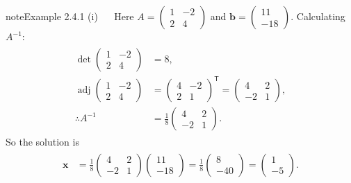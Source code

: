 \documentclass[letterpaper,10pt,english]{jupyterBook}
\begin{document}
\begin{sphinxadmonition}{note}{Example 2.4.1}
\sphinxAtStartPar
(i)   Here \(A = \begin{pmatrix} 1 & -2 \\ 2 & 4 \end{pmatrix}\) and \(\mathbf{b} = \begin{pmatrix} 11 \\ -18 \end{pmatrix}\). Calculating \(A^{-1}\):
\begin{equation*}
\begin{split} \begin{align*}
    \det\begin{pmatrix} 1 & -2 \\ 2 & 4 \end{pmatrix} &= 8, \\
    \operatorname{adj}\begin{pmatrix} 1 & -2 \\ 2 & 4 \end{pmatrix} &=
    \begin{pmatrix} 4 & -2 \\ 2 & 1 \end{pmatrix}^\mathsf{T} =
    \begin{pmatrix} 4 & 2 \\ -2 & 1 \end{pmatrix},\\
    \therefore A^{-1} &= \frac{1}{8} \begin{pmatrix} 4 & 2 \\ -2 & 1 \end{pmatrix}.
\end{align*} \end{split}
\end{equation*}
\sphinxAtStartPar
So the solution is
\begin{equation*}
\begin{split} \begin{align*}
    \mathbf{x} &= \frac{1}{8} \begin{pmatrix} 4 & 2 \\ -2 & 1 \end{pmatrix}
    \begin{pmatrix} 11 \\ -18 \end{pmatrix} =
    \frac{1}{8} \begin{pmatrix} 8 \\ -40 \end{pmatrix} =
    \begin{pmatrix} 1 \\ -5 \end{pmatrix}.

\end{align*}
\end{split}
\end{equation*}
\end{sphinxadmonition}
\end{document}
